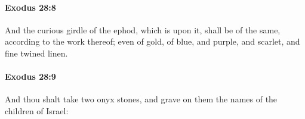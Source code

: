 		\paragraph{Exodus 28:8} %
			\label{EXODUS-28-8}

			And the curious girdle of the ephod, which is upon it, shall be of the same, according to the work thereof; even of gold, of blue, and purple, and scarlet, and fine twined linen.


		\paragraph{Exodus 28:9} %
			\label{EXODUS-28-9}

			And thou shalt take two onyx stones, and grave on them the names of the children of Israel:


